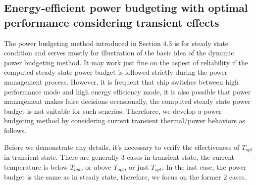 
\subsection{Energy-efficient power budgeting with optimal performance considering transient effects}



The power budgeting method introduced in Section $4.3$ is for steady state condition and serves mostly for illustration of the basic idea of the dynamic power budgeting method. It may work just fine on the aspect of reliability if the computed steady state power budget is followed strictly during the power management process. However, it is frequent that chip switches between high performance mode and high energy efficiency mode, it is also possible that power management makes false decisions occasionally, the computed steady state power budget is not suitable for such senerios. Thereforce, we develop a power budgeting method by considering current transient thermal/power behaviors as follows.

Before we demonstrate any details, it's necessary to verify the effectiveness of $T_{opt}$ in transient state. There are generally $3$ cases in transient state, the current temperature is below $T_{opt}$, or above $T_{opt}$, or just $T_{opt}$. In the last case, the power budget is the same as in steady state, therefore, we focus on the former $2$ cases.

